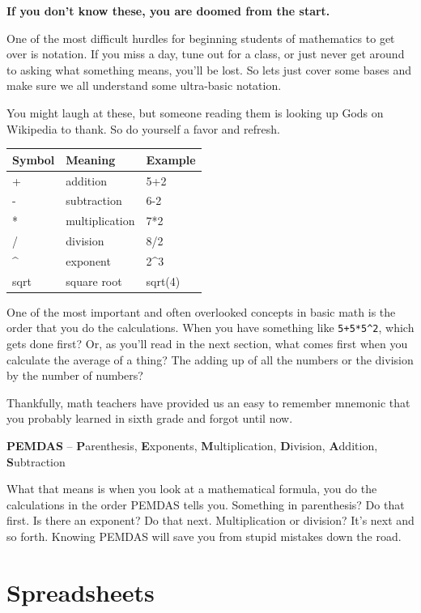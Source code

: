 \documentclass[
]{book}
\begin{document}
\textbf{If you don't know these, you are doomed from the start.}

One of the most difficult hurdles for beginning students of mathematics to get over is notation. If you miss a day, tune out for a class, or just never get around to asking what something means, you'll be lost. So lets just cover some bases and make sure we all understand some ultra-basic notation.

You might laugh at these, but someone reading them is looking up Gods on Wikipedia to thank. So do yourself a favor and refresh.

\begin{longtable}[]{@{}lll@{}}
\toprule
Symbol & Meaning & Example \\
\midrule
\endhead
+ & addition & 5+2 \\
- & subtraction & 6-2 \\
* & multiplication & 7*2 \\
/ & division & 8/2 \\
\^{} & exponent & 2\^{}3 \\
sqrt & square root & sqrt(4) \\
\bottomrule
\end{longtable}

One of the most important and often overlooked concepts in basic math is the order that you do the calculations. When you have something like \texttt{5+5*5\^{}2}, which gets done first? Or, as you'll read in the next section, what comes first when you calculate the average of a thing? The adding up of all the numbers or the division by the number of numbers?

Thankfully, math teachers have provided us an easy to remember mnemonic that you probably learned in sixth grade and forgot until now.

\textbf{PEMDAS} -- \textbf{P}arenthesis, \textbf{E}xponents, \textbf{M}ultiplication, \textbf{D}ivision, \textbf{A}ddition, \textbf{S}ubtraction

What that means is when you look at a mathematical formula, you do the calculations in the order PEMDAS tells you. Something in parenthesis? Do that first. Is there an exponent? Do that next. Multiplication or division? It's next and so forth. Knowing PEMDAS will save you from stupid mistakes down the road.

\hypertarget{spreadsheets}{%
\section{Spreadsheets}\label{spreadsheets}}
\end{document}
